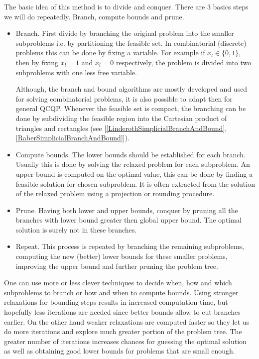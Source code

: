 \documentclass[12pt]{book}
\theoremstyle{definition}
\begin{document}
The basic idea of this method is to divide and conquer. There are 3 basics steps we will do repeatedly. Branch, compute bounds and prune.
\begin{itemize}
\item Branch. First divide by branching the original problem into the smaller subproblems i.e. by partitioning the feasible set. 
 In combinatorial (discrete) problems this can be done by fixing a variable. For example if $x_l \in \{0,1\}$, then by fixing $x_l=1$ and $x_l=0$ respectively, the problem is divided into two subproblems with one less free variable. 

Although, the branch and bound algorithms are mostly developed and used for solving combinatorial problems, it is also possible to adapt then for general QCQP. Whenever the feasible set is compact, the branching can be done by subdividing the feasible region into the Cartesian product of triangles and rectangles (see [\ref{LinderothSimplicialBranchAndBound}, \ref{RaberSimplicialBranchAndBound}]). 


\item Compute bounds. The lower bounds should be established for each branch. Usually this is done by solving the relaxed problem for each subproblem. 
An upper bound is computed on the optimal value, this can be done by finding a feasible solution for chosen subproblem. It is often extracted from the solution of the relaxed problem using a projection or rounding procedure.

\item Prune. Having both lower and upper bounds, conquer by pruning all the branches with lower bound greater then global upper bound. The optimal solution is surely not in these branches.

\item Repeat. This process is repeated by branching the remaining subproblems, computing the new (better) lower bounds for these smaller problems, improving the upper bound and further pruning the problem tree.
\end{itemize}

One can use more or less clever techniques to decide when, how and which subproblems to branch or how and when to compute bounds.
Using stronger relaxations for bounding steps results in increased computation time, but hopefully less iterations are needed since better bounds allow to cut branches earlier.  On the other hand weaker relaxations are computed faster so they let us do more iterations and explore much greater portion of the problem tree. The greater number of iterations increases chances for guessing the optimal solution as well as obtaining good lower bounds for problems that are small enough.
\end{document}
